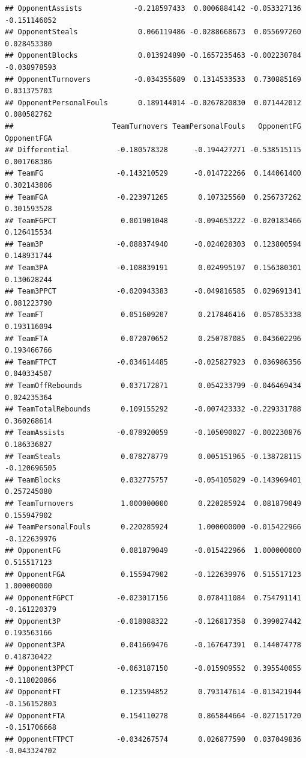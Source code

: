\documentclass[]{book}
\begin{document}
\begin{verbatim}
## OpponentAssists            -0.218597433  0.0006884142 -0.053327136 -0.151146052
## OpponentSteals              0.066119486 -0.0288668673  0.055697260  0.028453380
## OpponentBlocks              0.013924890 -0.1657235463 -0.002230784 -0.038978593
## OpponentTurnovers          -0.034355689  0.1314533533  0.730885169  0.031375703
## OpponentPersonalFouls       0.189144014 -0.0267820830  0.071442012  0.080582762
##                       TeamTurnovers TeamPersonalFouls   OpponentFG  OpponentFGA
## Differential           -0.180578328      -0.194427271 -0.538515115  0.001768386
## TeamFG                 -0.143210529      -0.014722266  0.144061400  0.302143806
## TeamFGA                -0.223971265       0.107325560  0.256737262  0.301593528
## TeamFGPCT               0.001901048      -0.094653222 -0.020183466  0.126415534
## Team3P                 -0.088374940      -0.024028303  0.123800594  0.148931744
## Team3PA                -0.108839191       0.024995197  0.156380301  0.130628244
## Team3PPCT              -0.020943383      -0.049816585  0.029691341  0.081223790
## TeamFT                  0.051609207       0.217846416  0.057853338  0.193116094
## TeamFTA                 0.072070652       0.250787085  0.043602296  0.193466766
## TeamFTPCT              -0.034614485      -0.025827923  0.036986356  0.040334507
## TeamOffRebounds         0.037172871       0.054233799 -0.046469434  0.024235364
## TeamTotalRebounds       0.109155292      -0.007423332 -0.229331788  0.360268614
## TeamAssists            -0.078920059      -0.105090027 -0.002230876  0.186336827
## TeamSteals              0.078278779       0.005151965 -0.138728115 -0.120696505
## TeamBlocks              0.032775757      -0.054105029 -0.143969401  0.257245080
## TeamTurnovers           1.000000000       0.220285924  0.081879049  0.155947902
## TeamPersonalFouls       0.220285924       1.000000000 -0.015422966 -0.122639976
## OpponentFG              0.081879049      -0.015422966  1.000000000  0.515517123
## OpponentFGA             0.155947902      -0.122639976  0.515517123  1.000000000
## OpponentFGPCT          -0.023017156       0.078411084  0.754791141 -0.161220379
## Opponent3P             -0.018088322      -0.126817358  0.399027442  0.193563166
## Opponent3PA             0.041669476      -0.167647391  0.144074778  0.418730422
## Opponent3PPCT          -0.063187150      -0.015909552  0.395540055 -0.118020866
## OpponentFT              0.123594852       0.793147614 -0.013421944 -0.156152803
## OpponentFTA             0.154110278       0.865844664 -0.027151720 -0.151706668
## OpponentFTPCT          -0.034267574       0.026877590  0.037049836 -0.043324702

\end{verbatim}
\end{document}
